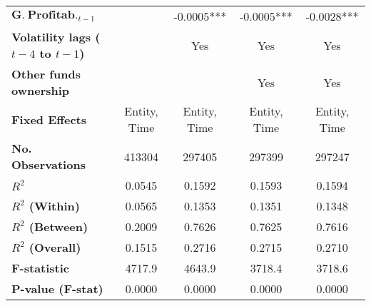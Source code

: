 {\begin{longtable}{>{\bfseries}lcccc}
$\mathbf{G.~Profitab.}_{t-1}$          &                    &            -0.0005***            &            -0.0005***             &        -0.0028***         \\
Volatility lags ($t - 4$ to $t - 1$) &  & Yes & Yes & Yes \\
Other funds ownership &  &  & Yes  & Yes\\
\midrule
Fixed Effects                           &       Entity, Time       &        Entity, Time             &            Entity, Time          &       Entity, Time  \\
\bottomrule
\toprule
No. Observations                  &       413304       &             297405            &             297399             &         297247         \\
$R^{2}$                         &       0.0545       &             0.1592            &             0.1593             &         0.1594         \\
$R^{2}$ (Within)                &       0.0565       &             0.1353            &             0.1351             &         0.1348         \\
$R^{2}$ (Between)               &       0.2009       &             0.7626            &             0.7625             &         0.7616         \\
$R^{2}$ (Overall)               &       0.1515       &             0.2716            &             0.2715             &         0.2710         \\
F-statistic                       &       4717.9       &             4643.9            &             3718.4             &         3718.6         \\
P-value (F-stat)                  &       0.0000       &             0.0000            &             0.0000             &         0.0000         \\
\bottomrule
\end{longtable}
}
